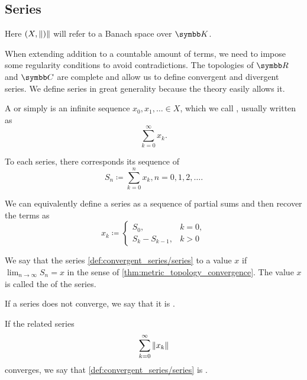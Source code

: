 \subsection{Series}\label{subsec:series}

Here \( (X, \left\Vert ) \right\Vert \) will refer to a Banach space over \( \BK \).

\begin{definition}\label{def:convergent_series}
  When extending addition to a countable amount of terms, we need to impose some regularity conditions to avoid contradictions. The topologies of \( \BR \) and \( \BC \) are complete and allow us to define convergent and divergent series. We define series in great generality because the theory easily allows it.

  A  or simply  is an infinite sequence \( x_0, x_1, \ldots \in X \), which we call , usually written as
  \begin{equation}\label{def:convergent_series/series}
    \sum_{k=0}^\infty x_k.
  \end{equation}

  To each series, there corresponds its sequence of 
  \begin{equation*}
    S_n \coloneqq \sum_{k=0}^n x_k, n = 0, 1, 2, \ldots.
  \end{equation*}

  We can equivalently define a series as a sequence of partial sums and then recover the terms as
  \begin{equation*}
    x_k \coloneqq \begin{cases}
      S_0,           &k = 0, \\
      S_k - S_{k-1}, &k > 0
    \end{cases}
  \end{equation*}

  We say that the series \cref{def:convergent_series/series}  to a value \( x \) if \( \lim_{n \to \infty} S_n = x \) in the sense of \cref{thm:metric_topology_convergence}. The value \( x \) is called the  of the series.

  If a series does not converge, we say that it is .

  If the related series
  \begin{equation}\label{def:convergent_series/absolute_series}
    \sum_{k=0}^\infty \left\Vert x_k \right\Vert
  \end{equation}
  converges, we say that \cref{def:convergent_series/series} is .
\end{definition}


